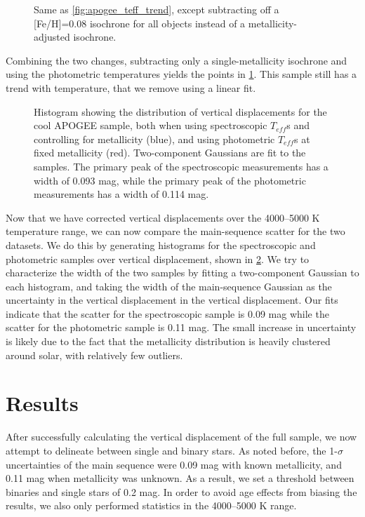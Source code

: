 \documentclass[manuscript]{aastex6}
\newcommand{\Teff}{\ensuremath{T_{eff}}}
\begin{document}
\begin{figure}[htb]
    \centering
    \caption{Same as \cref{fig:apogee_teff_trend}, except subtracting off a
    [Fe/H]=0.08 isochrone for all objects instead of a metallicity-adjusted
isochrone.}\label{fig:photuncor}
\end{figure}

Combining the two changes, subtracting only a single-metallicity isochrone and
using the photometric temperatures yields the points in \cref{fig:photuncor}.
This sample still has a trend with temperature, that we remove using a linear
fit.

\begin{figure}[htb]
    \centering
    \caption{Histogram showing the distribution of vertical displacements for
        the cool APOGEE sample, both when using spectroscopic \Teff{}s and
    controlling for metallicity (blue), and using photometric \Teff{}s at 
fixed metallicity (red). Two-component Gaussians are fit to the samples. The
primary peak of the spectroscopic measurements has a width of 0.093 mag, while
the primary peak of the photometric measurements has a width of 0.114 mag.}
    \label{fig:histcompare}
\end{figure}

Now that we have corrected vertical displacements over the 4000--5000 K
temperature range, we can now compare the main-sequence scatter for the two
datasets. We do this by generating histograms for the spectroscopic and
photometric samples over vertical displacement, shown in
\cref{fig:histcompare}. We try to characterize the width of the two samples by
fitting a two-component Gaussian to each histogram, and taking the width of the
main-sequence Gaussian as the uncertainty in the vertical displacement in the
vertical displacement. Our fits indicate that the scatter for the spectroscopic
sample is 0.09 mag while the scatter for the photometric sample is 0.11 mag.
The small increase in uncertainty is likely due to the fact that the
metallicity distribution is heavily clustered around solar, with relatively few
outliers.

\section{Results}
\label{sec:results}


After successfully calculating the vertical displacement of the full sample, we
now attempt to delineate between single and binary stars. As noted before, the
1-\(\sigma\) uncertainties of the main sequence were 0.09 mag with known
metallicity, and 0.11 mag when metallicity was unknown. As a result, we set a
threshold between binaries and single stars of 0.2 mag. In order to avoid
age effects from biasing the results, we also only performed statistics in the
4000--5000 K range.
\end{document}
